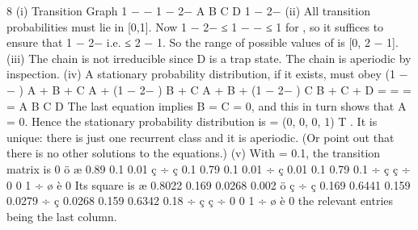 \documentclass[a4paper,12pt]{article}
\begin{document}
\newpage


8
(i)
Transition Graph
1 − \alpha − 
1 − 2\alpha − 
\alpha
A
B
\alpha
{}
\alpha
\alpha
C
D
1 − 2\alpha − 
(ii) All transition probabilities must lie in [0,1].
Now 1 − 2\alpha −  ≤ 1 − \alpha −  ≤ 1 for \alpha {}, so it suffices to ensure that 1 − 2\alpha −   i.e. \alpha ≤ 2 − 1. So the range of possible values of
\alpha is [0, 2 − 1].
(iii) The chain is not irreducible since D is a trap state.
The chain is aperiodic by inspection.
(iv) A stationary probability distribution, if it exists, must obey
(1 − \alpha −  ) \pi A + \alpha\pi B +  \pi C
\alpha\pi A + (1 − 2\alpha −  ) \pi B + \alpha\pi C
 \pi A + \alpha\pi B + (1 − 2\alpha −  ) \pi C
 \pi B + \alpha\pi C + \pi D
=
=
=
=
\pi A
\pi B
\pi C
\pi D
The last equation implies \pi B = \pi C = 0, and this in turn shows that \pi A = 0.
Hence the stationary probability distribution is \pi = (0, 0, 0, 1) T .
It is unique: there is just one recurrent class and it is aperiodic. (Or point out that there is no other solutions to the equations.)
(v)
With \alpha = 0.1, the transition matrix is
0 ö
æ 0.89 0.1 0.01
ç
÷
ç 0.1 0.79 0.1 0.01 ÷
ç 0.01 0.1 0.79 0.1 ÷
ç ç
÷
0
0
1 ÷ ø
è 0
Its square is
æ 0.8022 0.169 0.0268 0.002 ö
ç
÷
ç 0.169 0.6441 0.159 0.0279 ÷
ç 0.0268 0.159 0.6342 0.18 ÷
ç ç
÷
0
0
1 ÷ ø
è 0
the relevant entries being the last column.
\end{document}

